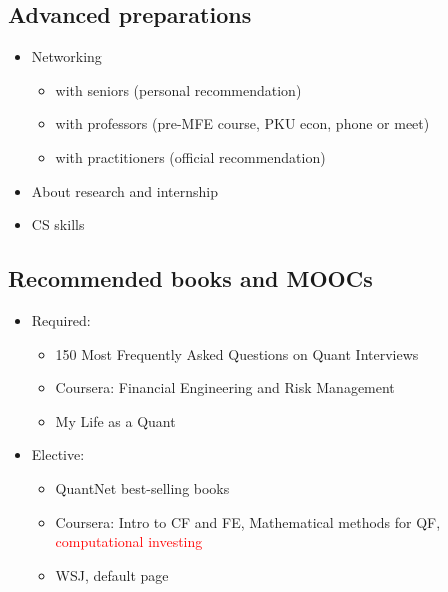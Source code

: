 \documentclass[
paper=128mm:96mm, %
fontsize=11pt, %
pagesize, %
parskip=half-, %
]{scrartcl} %
\theoremstyle{mythmstyle} %
\begin{document}
\clearpage


\subsection{Advanced preparations}

\begin{itemize}
\item Networking
	\begin{itemize}
		\item with seniors (personal recommendation)
		\item with professors (pre-MFE course, PKU econ, phone or meet)
		\item with practitioners (official recommendation)
	\end{itemize}
\item About research and internship
\item CS skills
\end{itemize}

\clearpage


\subsection{Recommended books and MOOCs}

\begin{itemize}
\item Required: 
	\begin{itemize}
		\item 150 Most Frequently Asked Questions on Quant Interviews
		\item Coursera: Financial Engineering and Risk Management
		\item My Life as a Quant
	\end{itemize}
\item Elective:
	\begin{itemize}
		\item QuantNet best-selling books
		\item Coursera: Intro to CF and FE, Mathematical methods for QF, \textcolor{red}{computational investing}
		\item WSJ, default page
	\end{itemize}
\end{itemize}

\clearpage
\end{document}
